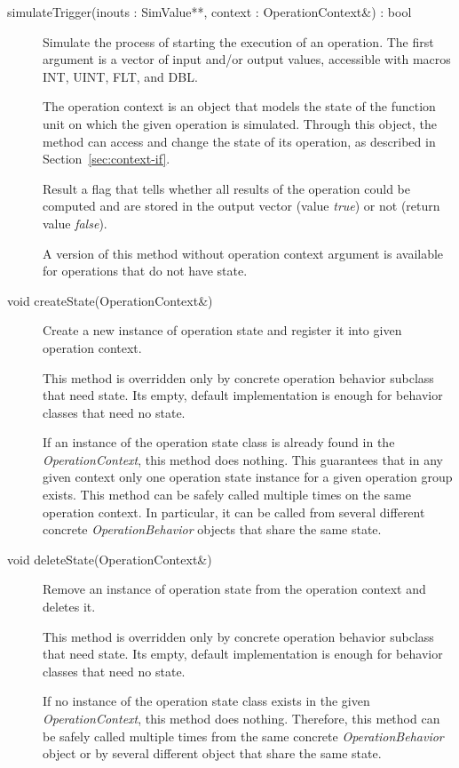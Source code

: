 \documentclass[a4paper,twoside]{tce}
\begin{document}
\begin{description}
\item[simulateTrigger(inouts : SimValue**, context : OperationContext\&) :
  bool] %
  Simulate the process of starting the execution of an operation. The first
  argument is a vector of input and/or output values, accessible with macros
  INT, UINT, FLT, and DBL.

  The operation context is an object that models the state of the function
  unit on which the given operation is simulated. Through this object, the
  method can access and change the state of its operation, as described in
  Section~\ref{sec:context-if}.

  Result a flag that tells whether all results of the operation could be
  computed and are stored in the output vector (value \emph{true}) or not
  (return value \emph{false}).

  A version of this method without operation context argument is available
  for operations that do not have state.

\item[void createState(OperationContext\&)]%
  Create a new instance of operation state and register it into given
  operation context.

  This method is overridden only by concrete operation behavior subclass
  that need state.  Its empty, default implementation is enough for behavior
  classes that need no state.

  If an instance of the operation state class is already found in the
  \emph{OperationContext}, this method does nothing.  This guarantees that
  in any given context only one operation state instance for a given
  operation group exists.  This method can be safely called multiple times
  on the same operation context.  In particular, it can be called from
  several different concrete \emph{OperationBehavior} objects that share the
  same state.

\item[void deleteState(OperationContext\&)]%
  Remove an instance of operation state from the operation context and
  deletes it.

  This method is overridden only by concrete operation behavior subclass
  that need state.  Its empty, default implementation is enough for behavior
  classes that need no state.

  If no instance of the operation state class exists in the given
  \emph{OperationContext}, this method does nothing.  Therefore, this method
  can be safely called multiple times from the same concrete
  \emph{OperationBehavior} object or by several different object that share
  the same state.
\end{description}
\end{document}
